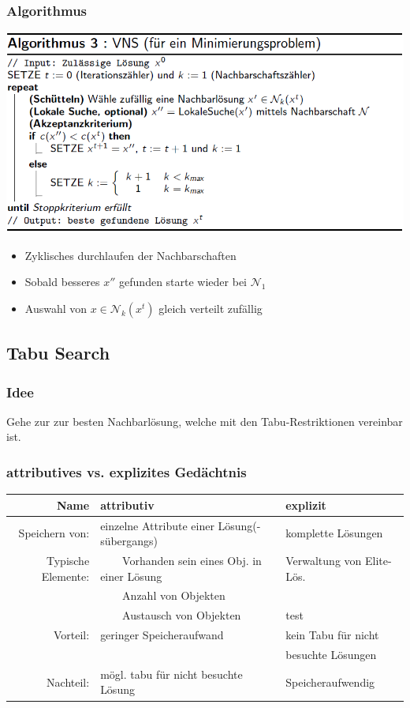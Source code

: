 \documentclass[12pt]{article}
\newcommand{\tabitem}{~~\llap{\textbullet}~~}
\begin{document}
			\subsubsection{Algorithmus}
				\includegraphics[scale=0.6]{VNS}
				\begin{itemize}
					\item Zyklisches durchlaufen der Nachbarschaften
					\item Sobald besseres $x''$ gefunden starte wieder bei $\mathcal{N}_1$
					\item Auswahl von $x\in\mathcal{N}_k(x^t)$ gleich verteilt zufällig
				\end{itemize}
		\subsection{Tabu Search}\label{TabuSearch}
			\subsubsection{Idee}
				Gehe zur zur besten Nachbarlösung, welche mit den Tabu-Restriktionen vereinbar ist.
			\subsubsection{attributives vs. explizites Gedächtnis}
				\begin{tabular}{r|l l}
					Name & attributiv 		& explizit \\ \hline
					Speichern von: & einzelne Attribute einer Lösung(-sübergangs) & komplette Lösungen \\
					Typische Elemente: 	& \tabitem Vorhanden sein eines Obj. in einer Lösung 	& Verwaltung von Elite-Lös.\\
										& \tabitem Anzahl von Objekten							& \\
										& \tabitem Austausch von Objekten 						&  test\\
					Vorteil: 			& geringer Speicheraufwand								& kein Tabu für nicht \\
										&														& besuchte Lösungen\\
					Nachteil:			& mögl. tabu für nicht besuchte Lösung					& Speicheraufwendig
				\end{tabular}
\end{document}
